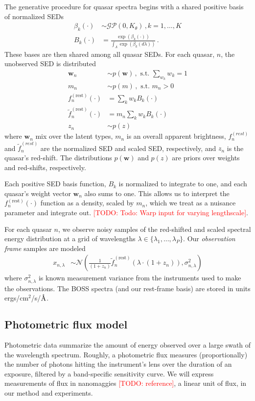 \documentclass{article}
\newcommand{\angstrom}{\textup{\AA}}
\newcommand{\red}[1]{\textcolor{red}{[TODO: #1]}}
\begin{document}
The generative procedure for quasar spectra begins with a shared positive basis of normalized SEDs
\begin{align}
  \beta_k(\cdot) &\sim \mathcal{GP}(0, K_\theta) \, , k=1, \dots, K\\
  B_k(\cdot) &= \frac{\exp(\beta_k(\cdot))}{\int_\Lambda \exp(\beta_k(d \lambda))}   \, .
\end{align}
These bases are then shared among all quasar SEDs.  For each quasar, $n$, the unobserved SED is distributed
\begin{align}
  \mathbf{w}_n &\sim p(\mathbf{w}) \, , \text{ s.t. } \sum_{w_k} w_k = 1  \\
  m_n  &\sim p(m) \, , \text{ s.t. } m_n > 0 \\
  f^{(\text{rest})}_n(\cdot) &= \sum_{k} w_k B_k(\cdot)\\
  \tilde f^{(\text{rest})}_n(\cdot) &= m_n \sum_{k} w_k B_k(\cdot) \\
  z_n &\sim p(z)
\end{align}
where $\mathbf{w}_n$ mix over the latent types, $m_n$ is an overall apparent brightness, $f_n^{(rest)}$ and $\tilde f_n^{(rest)}$ are the normalized SED and scaled SED, respectively, and $z_n$ is the quasar's red-shift.  The distributions $p(\mathbf{w})$ and $p(z)$ are priors over weights and red-shifts, respectively.  

Each positive SED basis function, $B_k$ is normalized to integrate to one, and each quasar's weight vector $\mathbf{w}_n$ also sums to one.  This allows us to interpret the $f^{(\text{rest})}_n(\cdot)$ function as a density, scaled by $m_n$, which we treat as a nuisance parameter and integrate out.  
\red{Todo: Warp input for varying lengthscale}.  

For each quasar $n$, we observe noisy samples of the red-shifted and scaled spectral energy distribution at a grid of wavelengths $\lambda \in \{\lambda_1, \dots, \lambda_P \}$.  Our \emph{observation frame} samples are modeled
\begin{align}
  x_{n, \lambda} 
    &\sim \mathcal{N}\left( \frac{1}{(1 + z_n)} \tilde f_n^{(\text{rest})}( \lambda \cdot (1 + z_n) ), \sigma_{n,\lambda}^2 \right)
    \label{eq:spec} 
\end{align}
where $\sigma_{n, \lambda}^2$ is known measurement variance from the instruments
used to make the observations.
The BOSS spectra (and our rest-frame basis) are stored in units ergs/cm$^2$/s/$\angstrom$. 

\subsection{Photometric flux model }
Photometric data summarize the amount of energy observed over a large swath of the wavelength spectrum.  Roughly, a photometric flux measures (proportionally) the number of photons hitting the instrument's lens over the duration of an exposure, filtered by a band-specific sensitivity curve. 
We will express measurements of flux in nanomaggies \red{reference}, a linear unit of flux, in our method and experiments.  
\end{document}
